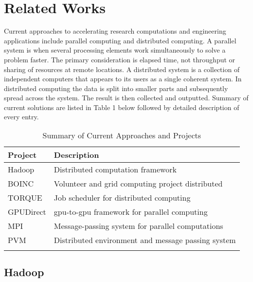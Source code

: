 \section{Related Works}

Current approaches to accelerating research computations and engineering
applications include parallel computing and distributed computing.  A parallel
system is when several processing elements work simultaneously to solve a
problem faster. The primary consideration is elapsed time, not throughput or
sharing of resources at remote locations. A distributed system is a collection
of independent computers that appears to its users as a single coherent system.
In distributed computing the data is split into smaller parts and subsequently
spread across the system. The result is then collected and outputted. Summary
of current solutions are listed in Table 1 below followed by detailed
description of every entry.\\

\begin{table}[htb]
\centering
\begin{tabular}{ll}
\toprule{}
\textbf{Project} & \textbf{Description} \\
\midrule{}
Hadoop      & Distributed computation framework \cite{website:Hadoop-Wiki}
              \cite{website:Apache-Hadoop} \cite{shvachko2011apache}\\
\midrule{}
BOINC       & Volunteer and grid computing project distributed
              \cite{anderson2004boinc} \\
\midrule{}
TORQUE      & Job scheduler for distributed computing
              \cite{website:TORQUE-Resource-Manager} \\
\midrule{}
GPUDirect   & \gls{gpu}-to-\gls{gpu} framework for parallel computing
              \cite{website:YouTube} \\
\midrule{}
MPI         & Message-passing system for parallel computations
              \cite{website:MPI-Tutorial} \cite{website:mpi-4-python} \\
\midrule
PVM         & Distributed environment and message passing system
              \cite{website:Computer-Science-and-Division} \\
\bottomrule{}
\end{tabular}
\caption{Summary of Current Approaches and Projects}
\end{table}

\subsection{Hadoop}

